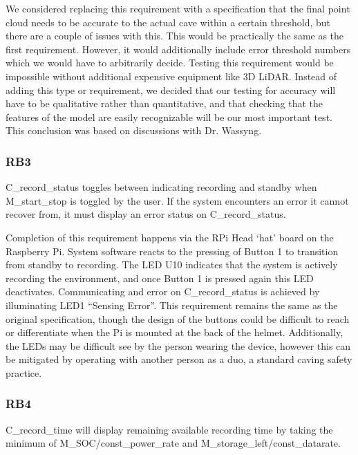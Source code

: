 \documentclass[11pt]{article}
\begin{document}
	We considered replacing this requirement with a specification that the final point cloud needs to be accurate to the actual cave within a certain threshold, but there are a couple of issues with this. This would be practically the same as the first requirement. However, it would additionally include  error threshold numbers which we would have to arbitrarily decide. Testing this requirement would be impossible without additional expensive equipment like 3D LiDAR. Instead of adding this type or requirement, we decided that our testing for accuracy will have to be qualitative rather than quantitative, and that checking that the features of the model are easily recognizable will be our most important test. This conclusion was based on discussions with Dr. Wassyng. 
	
	\subsubsection{RB3} 
	
	\begin{exampleblock}
		C\_record\_status toggles between indicating recording and standby when M\_start\_stop is toggled by the user. If the system encounters an error it cannot recover from, it must display an error status on C\_record\_status.
	\end{exampleblock}
	
	Completion of this requirement happens via the RPi Head ‘hat’ board on the Raspberry Pi. System software reacts to the pressing of Button 1 to transition from standby to recording. The LED U10 indicates that the system is actively recording the environment, and once Button 1 is pressed again this LED deactivates. Communicating and error on C\_record\_status is achieved by illuminating LED1 “Sensing Error”. This requirement remains the same as the original specification, though the design of the buttons could be difficult to reach or differentiate when the Pi is mounted at the back of the helmet. Additionally, the LEDs may be difficult see by the person wearing the device, however this can be mitigated by operating with another person as a duo, a standard caving safety practice. 
	
	\subsubsection{RB4} 
	
	\begin{exampleblock}
		C\_record\_time will display remaining available recording time by taking the minimum of M\_SOC/const\_power\_rate and M\_storage\_left/const\_datarate.
	\end{exampleblock}
	
\end{document}
